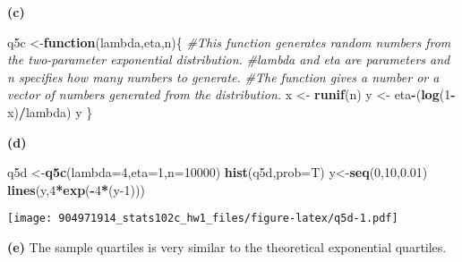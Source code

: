 \documentclass[
]{article}
\newenvironment{Shaded}{\begin{snugshade}}{\end{snugshade}}
\newcommand{\CommentTok}[1]{\textcolor[rgb]{0.56,0.35,0.01}{\textit{#1}}}
\newcommand{\ControlFlowTok}[1]{\textcolor[rgb]{0.13,0.29,0.53}{\textbf{#1}}}
\newcommand{\DataTypeTok}[1]{\textcolor[rgb]{0.13,0.29,0.53}{#1}}
\newcommand{\DecValTok}[1]{\textcolor[rgb]{0.00,0.00,0.81}{#1}}
\newcommand{\FloatTok}[1]{\textcolor[rgb]{0.00,0.00,0.81}{#1}}
\newcommand{\KeywordTok}[1]{\textcolor[rgb]{0.13,0.29,0.53}{\textbf{#1}}}
\newcommand{\NormalTok}[1]{#1}
\newcommand{\OperatorTok}[1]{\textcolor[rgb]{0.81,0.36,0.00}{\textbf{#1}}}
\newcommand{\StringTok}[1]{\textcolor[rgb]{0.31,0.60,0.02}{#1}}
\begin{document}
\textbf{(c)}

\begin{Shaded}
\begin{Highlighting}[]
\NormalTok{q5c <-}\ControlFlowTok{function}\NormalTok{(lambda,eta,n)\{}
\CommentTok{#This function generates random numbers from the two-parameter exponential distribution.}
\CommentTok{#lambda and eta are parameters and n specifies how many numbers to generate.}
\CommentTok{#The function gives a number or a vector of numbers generated from the distribution. }
\NormalTok{  x <-}\StringTok{ }\KeywordTok{runif}\NormalTok{(n)}
\NormalTok{  y <-}\StringTok{ }\NormalTok{eta}\OperatorTok{-}\NormalTok{(}\KeywordTok{log}\NormalTok{(}\DecValTok{1}\OperatorTok{-}\NormalTok{x)}\OperatorTok{/}\NormalTok{lambda)}
\NormalTok{  y}
\NormalTok{\}}
\end{Highlighting}
\end{Shaded}

\textbf{(d)}

\begin{Shaded}
\begin{Highlighting}[]
\NormalTok{q5d <-}\KeywordTok{q5c}\NormalTok{(}\DataTypeTok{lambda=}\DecValTok{4}\NormalTok{,}\DataTypeTok{eta=}\DecValTok{1}\NormalTok{,}\DataTypeTok{n=}\DecValTok{10000}\NormalTok{)}
\KeywordTok{hist}\NormalTok{(q5d,}\DataTypeTok{prob=}\NormalTok{T)}
\NormalTok{y<-}\KeywordTok{seq}\NormalTok{(}\DecValTok{0}\NormalTok{,}\DecValTok{10}\NormalTok{,}\FloatTok{0.01}\NormalTok{)}
\KeywordTok{lines}\NormalTok{(y,}\DecValTok{4}\OperatorTok{*}\KeywordTok{exp}\NormalTok{(}\OperatorTok{-}\DecValTok{4}\OperatorTok{*}\NormalTok{(y}\DecValTok{-1}\NormalTok{)))}
\end{Highlighting}
\end{Shaded}

\texttt{[image: 904971914\_stats102c\_hw1\_files/figure-latex/q5d-1.pdf]}

\textbf{(e)} The sample quartiles is very similar to the theoretical
exponential quartiles.
\end{document}
